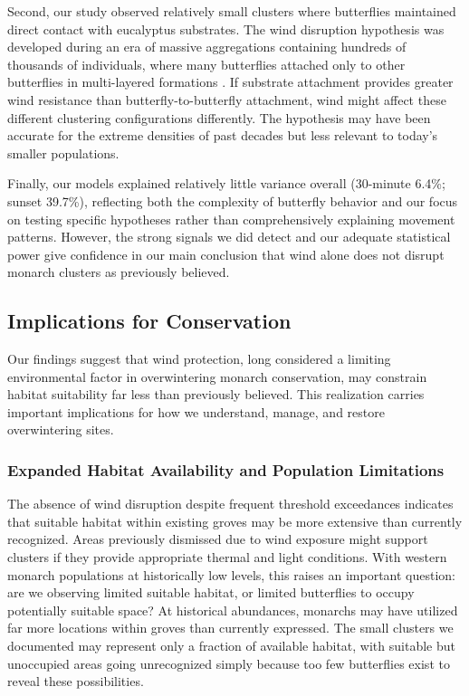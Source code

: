 Second, our study observed relatively small clusters where butterflies maintained direct contact with eucalyptus substrates. The wind disruption hypothesis was developed during an era of massive aggregations containing hundreds of thousands of individuals, where many butterflies attached only to other butterflies in multi-layered formations \parencite{leongMicroenvironmentalFactorsAssociated1990,browerMonarchButterflyClusters2008}. If substrate attachment provides greater wind resistance than butterfly-to-butterfly attachment, wind might affect these different clustering configurations differently. The hypothesis may have been accurate for the extreme densities of past decades but less relevant to today's smaller populations.

Finally, our models explained relatively little variance overall (30-minute 6.4\%; sunset 39.7\%), reflecting both the complexity of butterfly behavior and our focus on testing specific hypotheses rather than comprehensively explaining movement patterns. However, the strong signals we did detect and our adequate statistical power give confidence in our main conclusion that wind alone does not disrupt monarch clusters as previously believed.

\subsection{Implications for Conservation}

Our findings suggest that wind protection, long considered a limiting environmental factor in overwintering monarch conservation, may constrain habitat suitability far less than previously believed. This realization carries important implications for how we understand, manage, and restore overwintering sites.

\subsubsection{Expanded Habitat Availability and Population Limitations}

The absence of wind disruption despite frequent threshold exceedances indicates that suitable habitat within existing groves may be more extensive than currently recognized. Areas previously dismissed due to wind exposure might support clusters if they provide appropriate thermal and light conditions. With western monarch populations at historically low levels, this raises an important question: are we observing limited suitable habitat, or limited butterflies to occupy potentially suitable space? At historical abundances, monarchs may have utilized far more locations within groves than currently expressed. The small clusters we documented may represent only a fraction of available habitat, with suitable but unoccupied areas going unrecognized simply because too few butterflies exist to reveal these possibilities.

